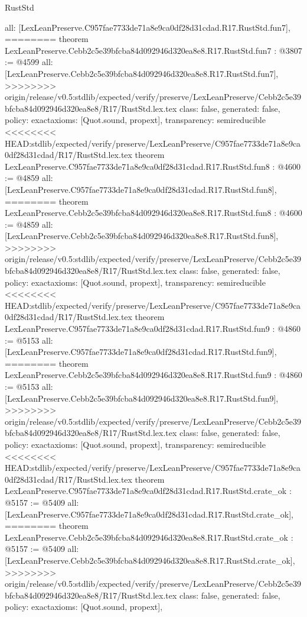 \begin{lexlean}{RustStd}
\begin{coremodule}
{\begin{coremodule}
{{{{{{{{{{  all: [LexLeanPreserve.C957fae7733de71a8e9ca0df28d31cdad.R17.RustStd.fun7],
========
theorem LexLeanPreserve.Cebb2c5e39bfcba84d092946d320ea8e8.R17.RustStd.fun7 : @3807 := @4599 {
  all: [LexLeanPreserve.Cebb2c5e39bfcba84d092946d320ea8e8.R17.RustStd.fun7],
>>>>>>>> origin/release/v0.5:stdlib/expected/verify/preserve/LexLeanPreserve/Cebb2c5e39bfcba84d092946d320ea8e8/R17/RustStd.lex.tex
  class: false,
  generated: false,
  policy: exact{axioms: [Quot.sound, propext]},
  transparency: semireducible
}
<<<<<<<< HEAD:stdlib/expected/verify/preserve/LexLeanPreserve/C957fae7733de71a8e9ca0df28d31cdad/R17/RustStd.lex.tex
theorem LexLeanPreserve.C957fae7733de71a8e9ca0df28d31cdad.R17.RustStd.fun8 : @4600 := @4859 {
  all: [LexLeanPreserve.C957fae7733de71a8e9ca0df28d31cdad.R17.RustStd.fun8],
========
theorem LexLeanPreserve.Cebb2c5e39bfcba84d092946d320ea8e8.R17.RustStd.fun8 : @4600 := @4859 {
  all: [LexLeanPreserve.Cebb2c5e39bfcba84d092946d320ea8e8.R17.RustStd.fun8],
>>>>>>>> origin/release/v0.5:stdlib/expected/verify/preserve/LexLeanPreserve/Cebb2c5e39bfcba84d092946d320ea8e8/R17/RustStd.lex.tex
  class: false,
  generated: false,
  policy: exact{axioms: [Quot.sound, propext]},
  transparency: semireducible
}
<<<<<<<< HEAD:stdlib/expected/verify/preserve/LexLeanPreserve/C957fae7733de71a8e9ca0df28d31cdad/R17/RustStd.lex.tex
theorem LexLeanPreserve.C957fae7733de71a8e9ca0df28d31cdad.R17.RustStd.fun9 : @4860 := @5153 {
  all: [LexLeanPreserve.C957fae7733de71a8e9ca0df28d31cdad.R17.RustStd.fun9],
========
theorem LexLeanPreserve.Cebb2c5e39bfcba84d092946d320ea8e8.R17.RustStd.fun9 : @4860 := @5153 {
  all: [LexLeanPreserve.Cebb2c5e39bfcba84d092946d320ea8e8.R17.RustStd.fun9],
>>>>>>>> origin/release/v0.5:stdlib/expected/verify/preserve/LexLeanPreserve/Cebb2c5e39bfcba84d092946d320ea8e8/R17/RustStd.lex.tex
  class: false,
  generated: false,
  policy: exact{axioms: [Quot.sound, propext]},
  transparency: semireducible
}
<<<<<<<< HEAD:stdlib/expected/verify/preserve/LexLeanPreserve/C957fae7733de71a8e9ca0df28d31cdad/R17/RustStd.lex.tex
theorem LexLeanPreserve.C957fae7733de71a8e9ca0df28d31cdad.R17.RustStd.crate_ok : @5157 := @5409 {
  all: [LexLeanPreserve.C957fae7733de71a8e9ca0df28d31cdad.R17.RustStd.crate_ok],
========
theorem LexLeanPreserve.Cebb2c5e39bfcba84d092946d320ea8e8.R17.RustStd.crate_ok : @5157 := @5409 {
  all: [LexLeanPreserve.Cebb2c5e39bfcba84d092946d320ea8e8.R17.RustStd.crate_ok],
>>>>>>>> origin/release/v0.5:stdlib/expected/verify/preserve/LexLeanPreserve/Cebb2c5e39bfcba84d092946d320ea8e8/R17/RustStd.lex.tex
  class: false,
  generated: false,
  policy: exact{axioms: [Quot.sound, propext]},
}}}}}}}}}}}}}}
\end{coremodule}}
\end{coremodule}
\end{lexlean}
